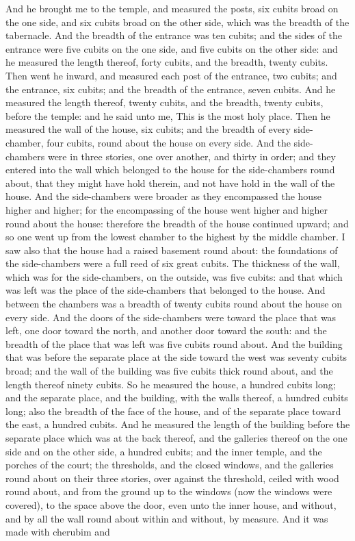 And he brought me to the temple, and measured the posts, six cubits broad on the one side, and six cubits broad on the other side, which was the breadth of the tabernacle. And the breadth of the entrance was ten cubits; and the sides of the entrance were five cubits on the one side, and five cubits on the other side: and he measured the length thereof, forty cubits, and the breadth, twenty cubits. Then went he inward, and measured each post of the entrance, two cubits; and the entrance, six cubits; and the breadth of the entrance, seven cubits. And he measured the length thereof, twenty cubits, and the breadth, twenty cubits, before the temple: and he said unto me, This is the most holy place.  Then he measured the wall of the house, six cubits; and the breadth of every side-chamber, four cubits, round about the house on every side. And the side-chambers were in three stories, one over another, and thirty in order; and they entered into the wall which belonged to the house for the side-chambers round about, that they might have hold therein, and not have hold in the wall of the house. And the side-chambers were broader as they encompassed the house higher and higher; for the encompassing of the house went higher and higher round about the house: therefore the breadth of the house continued upward; and so one went up from the lowest chamber to the highest by the middle chamber. I saw also that the house had a raised basement round about: the foundations of the side-chambers were a full reed of six great cubits. The thickness of the wall, which was for the side-chambers, on the outside, was five cubits: and that which was left was the place of the side-chambers that belonged to the house. And between the chambers was a breadth of twenty cubits round about the house on every side. And the doors of the side-chambers were toward the place that was left, one door toward the north, and another door toward the south: and the breadth of the place that was left was five cubits round about.  And the building that was before the separate place at the side toward the west was seventy cubits broad; and the wall of the building was five cubits thick round about, and the length thereof ninety cubits. So he measured the house, a hundred cubits long; and the separate place, and the building, with the walls thereof, a hundred cubits long; also the breadth of the face of the house, and of the separate place toward the east, a hundred cubits.  And he measured the length of the building before the separate place which was at the back thereof, and the galleries thereof on the one side and on the other side, a hundred cubits; and the inner temple, and the porches of the court; the thresholds, and the closed windows, and the galleries round about on their three stories, over against the threshold, ceiled with wood round about, and from the ground up to the windows (now the windows were covered), to the space above the door, even unto the inner house, and without, and by all the wall round about within and without, by measure. And it was made with cherubim and 